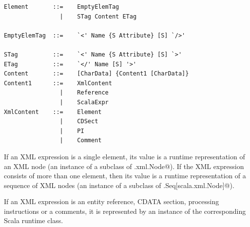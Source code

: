 \syntax\begin{lstlisting}
Element       ::=    EmptyElemTag
                |    STag Content ETag                                       

EmptyElemTag  ::=    `<' Name {S Attribute} [S] `/>'                         

STag          ::=    `<' Name {S Attribute} [S] `>'                          
ETag          ::=    `</' Name [S] '>'                                        
Content       ::=    [CharData] {Content1 [CharData]}
Content1      ::=    XmlContent
                |    Reference
                |    ScalaExpr
XmlContent    ::=    Element
                |    CDSect
                |    PI
                |    Comment
\end{lstlisting}

If an XML expression is a single element, its value is a runtime
representation of an XML node (an instance of a subclass of 
\lstinline@scala.xml.Node@). If the XML expression consists of more
than one element, then its value is a runtime representation of a
sequence of XML nodes (an instance of a subclass of 
\lstinline@scala.Seq[scala.xml.Node]@).

If an XML expression is an entity reference, CDATA section, processing 
instructions or a comments, it is represented by an instance of the 
corresponding Scala runtime class.

